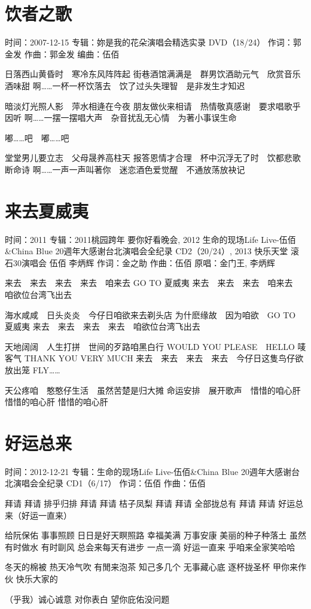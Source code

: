 \documentclass[UTF8,a4paper,oneside,twocolumn,12pt]{ctexbook}
\newcommand{\infopair}[2]{\textbullet #1：#2}
\newcommand{\zc}[1][伍佰]{\infopair{作词}{#1}}
\newcommand{\zq}[1][伍佰]{\infopair{作曲}{#1}}
\newcommand{\bq}[1][伍佰]{\infopair{编曲}{#1}}
\newcommand{\zj}[1]{\infopair{专辑}{#1}}
\newcommand{\yc}[1]{\infopair{原唱}{#1}}
\newcommand{\sj}[1]{\infopair{时间}{#1}}
\newenvironment{info}{\begin{flushleft}\kaishu
	}
	{\end{flushleft}\normalsize\yahei\par}
\newenvironment{lyric}{
	}
{}
\begin{document}
\section{饮者之歌}
\begin{info}
	\sj{2007-12-15}
	\zj{妳是我的花朵演唱会精选实录 DVD（18/24）}
	\zc[郭金发]
	\zq[郭金发]
	\bq[伍佰]
\end{info}
\begin{lyric}
	日落西山黄昏时　寒冷东风阵阵起
	街巷酒馆满满是　群男饮酒助元气　欣赏音乐酒味甜
	啊……一杯一杯饮落去　饮了过头失理智　是非发生才知迟

	暗淡灯光照人影　萍水相逄在今夜
	朋友做伙来相请　热情敬真感谢　要求唱歌乎因听
	啊……一摆一摆唱大声　杂音扰乱无心情　为著小事误生命

	嘟……吧　嘟……吧

	堂堂男儿要立志　父母晟养高柱天
	报答恩情才合理　杯中沉浮无了时　饮都悲歌断命诗
	啊……一声一声叫著你　迷恋酒色爱觉醒　不通放荡放袂记
\end{lyric}

\section{来去夏威夷} %
\begin{info}
	\sj{2011}
	\zj{2011桃园跨年 要你好看晚会, 2012 生命的现场Life Live-伍佰\&China Blue 20週年大感谢台北演唱会全纪录 CD2（20/24）, 2013 快乐天堂 滚石30演唱会 伍佰 李炳辉}
	\zc[金之助] %
	\zq
	\yc{金门王, 李炳辉}
\end{info}
\begin{lyric}
	来去　来去　来去　来去　咱来去 GO TO 夏威夷
	来去　来去　来去　咱来去　咱欲位台湾飞出去

	海水咸咸　日头炎炎　今仔日咱欲来去剃头店
	为什麽缘故　因为咱欲　GO TO 夏威夷
	来去　来去　来去　来去　咱欲位台湾飞出去

	天地阔阔　人生打拼　世间的歹路咱黑白行
	WOULD YOU PLEASE　HELLO 唛客气
	THANK YOU VERY MUCH
	来去　来去　来去　来去　今仔日这隻鸟仔欲放出笼
	FLY……

	天公疼咱　憨憨仔生活　虽然苦楚是归大摊
	命运安排　展开歌声　惜惜的咱心肝　惜惜的咱心肝 惜惜的咱心肝
\end{lyric}

\section{好运总来}
\begin{info}
	\sj{2012-12-21}
	\zj{生命的现场Life Live-伍佰\&China Blue 20週年大感谢台北演唱会全纪录 CD1（6/17）}
	\zc
	\zq
\end{info}
\begin{lyric}
	拜请 拜请 排乎归排
	拜请 拜请 桔子凤梨
	拜请 拜请 全部拢总有
	拜请 拜请 好运总来（好运一直来）

	给阮保佑 事事照顾 日日是好天瞑照路
	幸福美满 万事安康 美丽的种子种落土
	虽然有时做水 有时剾风 总会来每天有进步
	一点一滴 好运一直来 乎咱来全家笑哈哈

	冬天的棉被 热天冷气吹 有閒来泡茶 知己多几个
	无事藏心底 逐杯拢圣杯 甲你来作伙 快乐大家的

	（乎我）诚心诚意 对你表白 望你庇佑没问题
\end{lyric}
\end{document}

